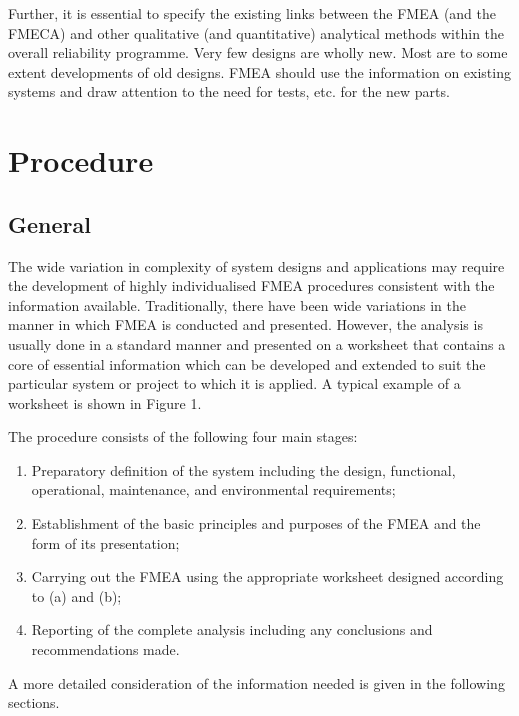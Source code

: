 \documentclass[./dissertation.tex]{subfiles}
\begin{document}
Further, it is essential to specify the existing links between the FMEA (and the FMECA) and other qualitative (and quantitative) analytical methods within the overall reliability programme.  Very few designs are wholly new. Most are to some extent developments of old designs. FMEA should use the information on existing systems and draw attention to the need for tests, etc. for the new parts.  



\section{Procedure}

\subsection{General}
The wide variation in complexity of system designs and applications may require the development of highly individualised FMEA procedures consistent with the information available. Traditionally, there have been wide variations in the manner in which FMEA is conducted and presented. However, the analysis is usually done in a standard manner and presented on a worksheet that contains a core of essential information which can be developed and extended to suit the particular system or project to which it is applied. A typical example of a worksheet is shown in Figure 1.

The procedure consists of the following four main stages:

\begin{enumerate}
\item Preparatory definition of the system including the design, functional, operational, maintenance, and environmental requirements;
\item Establishment of the basic principles and purposes of the FMEA and the form of its presentation;
\item Carrying out the FMEA using the appropriate worksheet designed according to (a) and (b);
\item Reporting of the complete analysis including any conclusions and recommendations made.
\end{enumerate}

A more detailed consideration of the information needed is given in the following sections.
\end{document}
